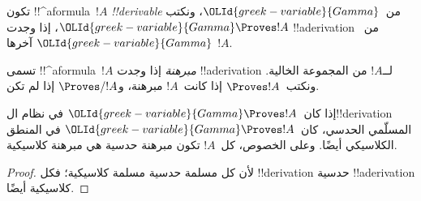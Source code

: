 \documentclass[../../../include/open-logic-section]{subfiles}
\begin{document}
\begin{defn}[!!^{derivability}]
تكون !!^a{formula}~$!A$ \emph{!!{derivable}} من~${\OLId{greek-variable}{Gamma}}$، ونكتب
${\OLId{greek-variable}{Gamma}} \Proves !A$، إذا وجدت !!a{derivation} من~${\OLId{greek-variable}{Gamma}}$ آخرها
$!A$.
\end{defn}

\begin{defn}[المبرهنات]
تسمى !!^a{formula}~$!A$ \emph{مبرهنة} إذا وجدت !!a{derivation}
لــ$!A$ من المجموعة الخالية. ونكتب~$\Proves !A$ إذا كانت~$!A$
مبرهنة، و$\Proves/ !A$ إذا لم تكن.
\end{defn}

\begin{prop}
  إذا كان~${\OLId{greek-variable}{Gamma}} \Proves !A$ في نظام ال!!{derivation} المسلّمي
  الحدسي، كان~${\OLId{greek-variable}{Gamma}} \Proves !A$ في المنطق الكلاسيكي أيضًا. وعلى
  الخصوص، كل~$!A$ تكون مبرهنة حدسية هي مبرهنة كلاسيكية.
\end{prop}

\begin{proof}
  لأن كل مسلمة حدسية مسلمة كلاسيكية؛ فكل !!{derivation} حدسية
  !!a{derivation} كلاسيكية أيضًا.
\end{proof}
\end{document}
